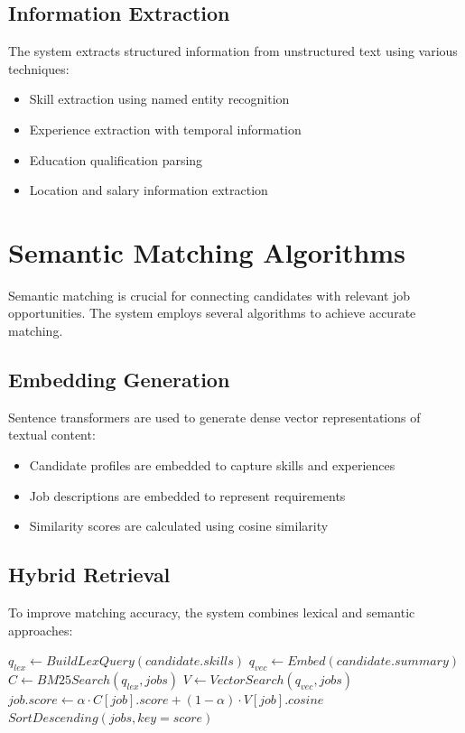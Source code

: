 \documentclass[12pt,a4paper]{report}
\begin{document}
\subsection{Information Extraction}
The system extracts structured information from unstructured text using various techniques:
\begin{itemize}[leftmargin=2em]
  \item Skill extraction using named entity recognition
  \item Experience extraction with temporal information
  \item Education qualification parsing
  \item Location and salary information extraction
\end{itemize}

\section{Semantic Matching Algorithms}
Semantic matching is crucial for connecting candidates with relevant job opportunities. The system employs several algorithms to achieve accurate matching.

\subsection{Embedding Generation}
Sentence transformers are used to generate dense vector representations of textual content:
\begin{itemize}[leftmargin=2em]
  \item Candidate profiles are embedded to capture skills and experiences
  \item Job descriptions are embedded to represent requirements
  \item Similarity scores are calculated using cosine similarity
\end{itemize}

\subsection{Hybrid Retrieval}
To improve matching accuracy, the system combines lexical and semantic approaches:
\begin{algorithm}
\caption{Hybrid Retrieval Algorithm}\label{alg:hybrid}
\begin{algorithmic}[1]
  \State $q_{lex} \gets BuildLexQuery(candidate.skills)$
  \State $q_{vec} \gets Embed(candidate.summary)$
  \State $C \gets BM25Search(q_{lex}, jobs)$
  \State $V \gets VectorSearch(q_{vec}, jobs)$
    \State $job.score \gets \alpha \cdot C[job].score + (1-\alpha) \cdot V[job].cosine$
  \EndFor
  \State \Return $SortDescending(jobs, key=score)$
\EndProcedure
\end{algorithmic}
\end{algorithm}
\end{document}
